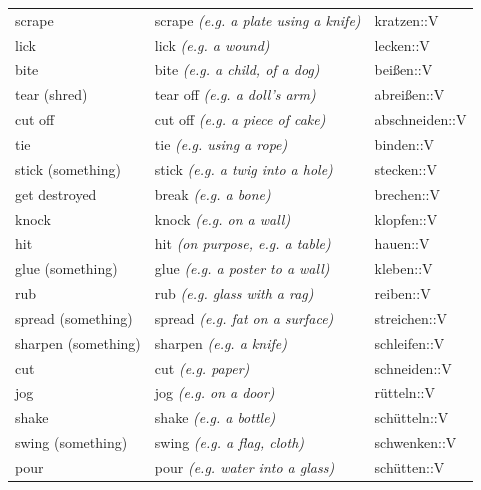 \begin{center}
\begin{longtable}{lll}
{\sc \lowercase{	SCRAPE	}}	&	scrape	\textit{\footnotesize (e.g. a plate using a knife)}	&	kratzen::V	\\
{\sc \lowercase{	LICK	}}	&	lick	\textit{\footnotesize (e.g. a wound)}	&	lecken::V	\\
{\sc \lowercase{	BITE	}}	&	bite	\textit{\footnotesize (e.g. a child, of a dog)}	&	beißen::V	\\
{\sc \lowercase{	TEAR \footnotesize (SHRED)	}}	&	tear off	\textit{\footnotesize (e.g. a doll's arm)}	&	abreißen::V	\\
{\sc \lowercase{	CUT OFF	}}	&	cut off	\textit{\footnotesize (e.g. a piece of cake)}	&	abschneiden::V	\\
{\sc \lowercase{	TIE	}}	&	tie	\textit{\footnotesize (e.g. using a rope)}	&	binden::V	\\
{\sc \lowercase{	STICK \footnotesize (SOMETHING)	}}	&	stick	\textit{\footnotesize (e.g. a twig into a hole)}	&	stecken::V	\\
{\sc \lowercase{	GET DESTROYED	}}	&	break	\textit{\footnotesize (e.g. a bone)}	&	brechen::V	\\
{\sc \lowercase{	KNOCK	}}	&	knock	\textit{\footnotesize (e.g. on a wall)}	&	klopfen::V	\\
{\sc \lowercase{	HIT	}}	&	hit	\textit{\footnotesize (on purpose, e.g. a table)}	&	hauen::V	\\
{\sc \lowercase{	GLUE \footnotesize (SOMETHING)	}}	&	glue	\textit{\footnotesize (e.g. a poster to a wall)}	&	kleben::V	\\
{\sc \lowercase{	RUB	}}	&	rub	\textit{\footnotesize (e.g. glass with a rag)}	&	reiben::V	\\
{\sc \lowercase{	SPREAD \footnotesize (SOMETHING)	}}	&	spread	\textit{\footnotesize (e.g. fat on a surface)}	&	streichen::V	\\
{\sc \lowercase{	SHARPEN \footnotesize (SOMETHING)	}}	&	sharpen	\textit{\footnotesize (e.g. a knife)}	&	schleifen::V	\\
{\sc \lowercase{	CUT	}}	&	cut	\textit{\footnotesize (e.g. paper)}	&	schneiden::V	\\
{\sc \lowercase{	JOG	}}	&	jog	\textit{\footnotesize (e.g. on a door)}	&	rütteln::V	\\
{\sc \lowercase{	SHAKE	}}	&	shake	\textit{\footnotesize (e.g. a bottle)}	&	schütteln::V	\\
{\sc \lowercase{	SWING \footnotesize (SOMETHING)	}}	&	swing	\textit{\footnotesize (e.g. a flag, cloth)}	&	schwenken::V	\\
{\sc \lowercase{	POUR	}}	&	pour	\textit{\footnotesize (e.g. water into a glass)}	&	schütten::V	\\

\end{longtable}
\end{center}
